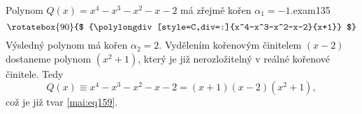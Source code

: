 \begin{mathexam}{Polynom \(Q(x) = x^4-x^3-x^2-x-2\) má zřejmě kořen \(\alpha_1=-1\).}{exam135} 
    \begin{equation*}
      \rotatebox{90}{$
        {\polylongdiv[style=C,div=:]{x^4-x^3-x^2-x-2}{x+1}}
      $}
    \end{equation*}
    Výsledný polynom má kořen \(\alpha_2=2\). Vydělením kořenovým činitelem \((x-2)\) dostaneme
    polynom \((x^2+1)\), který je již nerozložitelný v reálné kořenové činitele. Tedy
    \begin{equation*}
      Q(x) \equiv x^4-x^3-x^2-x-2 = (x+1)(x-2)(x^2+1), 
    \end{equation*}
    což je již tvar \eqref{mai:eq159}.
\end{mathexam}